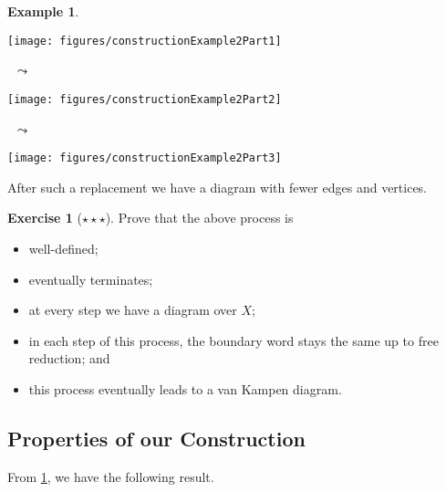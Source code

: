 \documentclass[11pt,a4paper,reqno]{amsart}
\theoremstyle{plain}
\theoremstyle{definition}
\theoremstyle{definition}
\newtheorem{exercise}[theorem]{Exercise}
\newtheorem{example}[theorem]{Example}
\newcommand\exerciseLevelHard{$\star${\,}$\star${\,}$\star$}
\begin{document}
\begin{enumerate}
\begin{enumerate}
\begin{example}
          \smallskip

          \begin{center}
          \begin{minipage}{.3\linewidth}
            \centering
            \texttt{[image: figures/constructionExample2Part1]}%
          \end{minipage}
          ~{\Large$\leadsto$}~
          \begin{minipage}{.2\linewidth}
            \centering
            \texttt{[image: figures/constructionExample2Part2]}%
          \end{minipage}
          ~{\Large$\leadsto$}~
          \begin{minipage}{.2\linewidth}
            \centering
            \texttt{[image: figures/constructionExample2Part3]}%
          \end{minipage}
          \end{center}
        
        \end{example}
    \end{enumerate}
    \noindent
    After such a replacement we have a diagram with fewer edges and vertices.
\end{enumerate}

\begin{exercise}[\exerciseLevelHard]\label{ex:van-kampen-construct}
Prove that the above process is
\begin{itemize}
  \item well-defined; \item eventually terminates; \item at every step we have a diagram over $X$; \item in each step of this process, the boundary word stays the same up to free reduction; and \item this process eventually leads to a van Kampen diagram.
\end{itemize}
\end{exercise}

\subsection{Properties of our Construction}

From \cref{ex:van-kampen-construct}, we have the following result.
\end{document}
